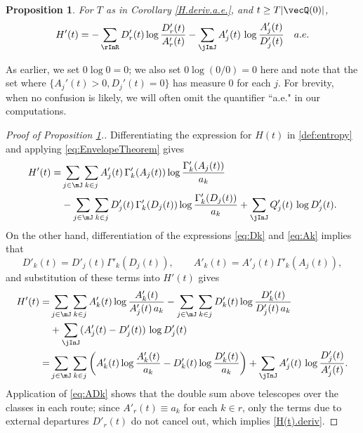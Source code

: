 \documentclass{amsart}
\newtheorem{proposition}{Proposition}
\begin{document}
\begin{proposition}\label{HDiff}
For $T$ as in Corollary \ref{H.deriv.a.e.}, and $t\ge T|\vecQ(0)|$, 
\begin{equation}\label{H(t).deriv}
H'(t) = 
- \sum_\rInR  D'_r(t) \log \frac{D'_r(t)}{A_r'(t)} 
- \sum_\jInJ A'_j(t) \, \log \frac{A'_j(t)}{D'_j(t)} \quad a.e. 
\end{equation}
\end{proposition}
As earlier, we set $0\log 0 = 0$; we also set $0\log (0/0) = 0$ here and note
that the set where $\{A_j'(t) > 0, D_j'(t) = 0\}$ has measure $0$ for each $j$.
For brevity, when no confusion is likely, we will often omit the quantifier ``a.e." in our computations.
\begin{proof}[Proof of Proposition \ref{HDiff}.]
Differentiating the expression for $H(t)$ in \eqref{def:entropy}
and applying \eqref{eq:EnvelopeTheorem} gives
\begin{align*}
H'(t) = 
& \sum_{j\in\mJ}\sum_{k\in j} A'_j(t) \, \Gamma'_k(A_j(t)) \log \frac{\Gamma'_k(A_j(t))}{a_k} \nonumber \\
& -\sum_{j\in\mJ}\sum_{k\in j} D'_j(t) \, \Gamma'_k(D_j(t)) \log \frac{\Gamma'_k(D_j(t))}{a_k}
+ \sum_\jInJ Q'_j(t) \, \log D'_j(t) .
\end{align*}
On the other hand, differentiation of the expressions \eqref{eq:Dk} and \eqref{eq:Ak} implies that
\begin{equation*}
D'_k(t) = D'_j(t)\Gamma'_k(D_j(t)), \qquad A'_k(t) = A'_j(t)\Gamma'_k(A_j(t)),
\end{equation*}
and substitution of these terms into $H'(t)$ gives
\begin{align*}
H'(t) = 
& \sum_{j\in\mJ}\sum_{k\in j} A'_k(t) \log \frac{A'_k(t)}{A'_j(t) \, a_k}
-\sum_{j\in\mJ}\sum_{k\in j} D'_k(t) \log \frac{D'_k(t)}{D'_j(t) \, a_k} \nonumber \\
& + \sum_\jInJ (A'_j(t)- D'_j(t)) \, \log D'_j(t) \\
= & \sum_{j\in\mJ}\sum_{k\in j}  \left(A'_k(t) \log \frac{A'_k(t)}{a_k} 
- D'_k(t) \log \frac{D'_k(t)}{a_k} \right)
+ \sum_\jInJ A'_j(t) \, \log \frac{D'_j(t)}{A'_j(t)} \nonumber .
\end{align*}
Application of \eqref{eq:ADk} shows that the double sum above telescopes over the classes in each route;
since  $A'_r(t) \equiv a_k$ for each $k\in r$, only the terms due to 
 external departures $D'_r(t)$ do not cancel out,  which implies
 \eqref{H(t).deriv}.
\end{proof}
\end{document}
